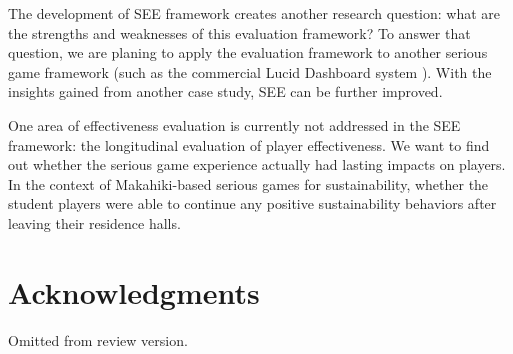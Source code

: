 \documentclass{sigchi}
\begin{document}
The development of SEE framework creates another research question:
what are the strengths and weaknesses of this evaluation framework? To
answer that question, we are planing to apply the evaluation framework
to another serious game framework (such as the
commercial Lucid Dashboard system \cite{building-dashboard}). With the
insights gained from another case study, SEE can be further
improved.

One area of effectiveness evaluation is currently not addressed in the
SEE framework: the longitudinal evaluation of player effectiveness.
We want to find out whether the serious game experience actually had
lasting impacts on players. In the context of Makahiki-based serious
games for sustainability, whether the student players were able to
continue any positive sustainability behaviors after leaving their
residence halls.

\section{Acknowledgments}
Omitted from review version.


%
%
%
%
%
\balance



\end{document}
